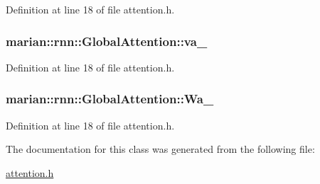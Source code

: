 Definition at line 18 of file attention.\+h.

\subsubsection[{\texorpdfstring{va\+\_\+}{va_}}]{ marian\+::rnn\+::\+Global\+Attention\+::va\+\_\+\hspace{0.3cm}{\ttfamily [private]}}\hypertarget{classmarian_1_1rnn_1_1GlobalAttention_abe451398726539e115ff20ed79be82cd}{}\label{classmarian_1_1rnn_1_1GlobalAttention_abe451398726539e115ff20ed79be82cd}


Definition at line 18 of file attention.\+h.

\subsubsection[{\texorpdfstring{Wa\+\_\+}{Wa_}}]{ marian\+::rnn\+::\+Global\+Attention\+::\+Wa\+\_\+\hspace{0.3cm}{\ttfamily [private]}}\hypertarget{classmarian_1_1rnn_1_1GlobalAttention_a084709a27aef6e0309431502ab74f0c5}{}\label{classmarian_1_1rnn_1_1GlobalAttention_a084709a27aef6e0309431502ab74f0c5}


Definition at line 18 of file attention.\+h.



The documentation for this class was generated from the following file\+:\begin{DoxyCompactItemize}
\item 
\hyperlink{attention_8h}{attention.\+h}\end{DoxyCompactItemize}
